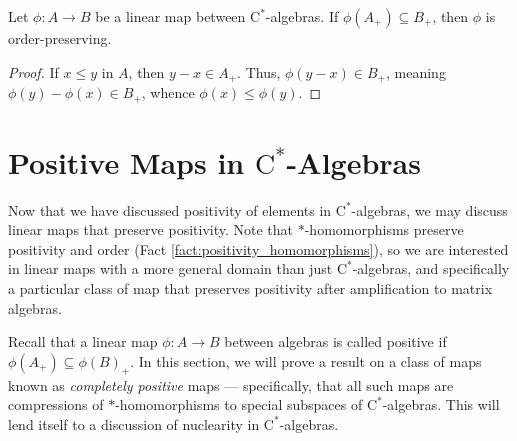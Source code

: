 \begin{corollary}\label{cor:positive_map_order_preserving}
  Let $\phi\colon A\rightarrow B$ be a linear map between $\mathrm{C}^{\ast}$-algebras. If $\phi\left( A_{+} \right)\subseteq B_{+}$, then $\phi$ is order-preserving.
\end{corollary}
\begin{proof}
  If $x\leq y$ in $A$, then $y-x\in A_{+}$. Thus, $\phi\left( y-x \right)\in B_{+}$, meaning $\phi\left( y \right)-\phi\left( x \right)\in B_{+}$, whence $\phi\left( x \right)\leq \phi\left( y \right)$.
\end{proof}

\section{Positive Maps in \texorpdfstring{$\mathrm{C}^{\ast}$-Algebras}{C*-Algebras}}%
Now that we have discussed positivity of elements in $\mathrm{C}^{\ast}$-algebras, we may discuss linear maps that preserve positivity. Note that $\ast$-homomorphisms preserve positivity and order (Fact \ref{fact:positivity_homomorphisms}), so we are interested in linear maps with a more general domain than just $\mathrm{C}^{\ast}$-algebras, and specifically a particular class of map that preserves positivity after amplification to matrix algebras.\newline

Recall that a linear map $\phi\colon A\rightarrow B$ between algebras is called positive if $\phi\left( A_{+} \right)\subseteq \phi\left( B \right)_{+}$. In this section, we will prove a result on a class of maps known as \textit{completely positive} maps --- specifically, that all such maps are compressions of $\ast$-homomorphisms to special subspaces of $\mathrm{C}^{\ast}$-algebras. This will lend itself to a discussion of nuclearity in $\mathrm{C}^{\ast}$-algebras.\newline

